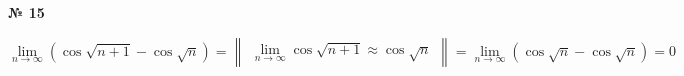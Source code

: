 \documentclass{article}
\begin{document}
\textbf{№ 15}

$$ \lim_{n\to\infty} \left( \cos{\sqrt{n+1}} - \cos{\sqrt{n}}\right) 
= \begin{Vmatrix}  \lim\limits_{n\to\infty} \cos{\sqrt{n+1}} \approx  \cos{\sqrt{n}} \end{Vmatrix} 
=  \lim\limits_{n\to\infty} \left( \cos{\sqrt{n}} - \cos{\sqrt{n}}\right) 
= 0 $$
\end{document}
